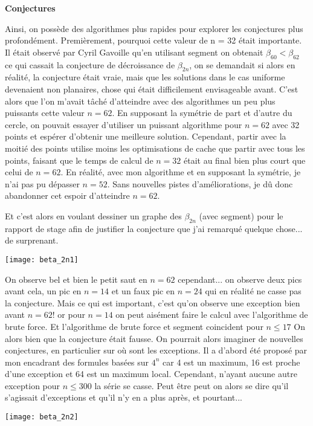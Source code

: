 \textbf{\Large{Conjectures}}

Ainsi, on possède des algorithmes plus rapides pour explorer les conjectures plus profondément. Premièrement, pourquoi cette valeur de n = 32 était importante. Il était observé par Cyril Gavoille qu'en utilisant segment on obtenait $\beta_{60} < \beta_{62}$ ce qui cassait la conjecture de décroissance de $\beta_{2n}$, on se demandait si alors en réalité, la conjecture était vraie, mais que les solutions dans le cas uniforme devenaient non planaires, chose qui était difficilement envisageable avant. C'est alors que l'on m'avait tâché d'atteindre avec des algorithmes un peu plus puissants cette valeur $n = 62$. En supposant la symétrie de part et d'autre du cercle, on pouvait essayer d'utiliser un puissant algorithme pour $n = 62$ avec 32 points et espérer d'obtenir une meilleure solution. Cependant, partir avec la moitié des points utilise moins les optimisations de cache que partir avec tous les points, faisant que le temps de calcul de $n = 32$ était au final bien plus court que celui de $n = 62$. En réalité, avec mon algorithme et en supposant la symétrie, je n'ai pas pu dépasser $n = 52$. Sans nouvelles pistes d'améliorations, je dû donc abandonner cet espoir d'atteindre $n = 62$.

Et c'est alors en voulant dessiner un graphe des $\beta_{2n}$ (avec segment) pour le rapport de stage afin de justifier la conjecture que j'ai remarqué quelque chose... de surprenant.

\texttt{[image: beta\_2n1]}

On observe bel et bien le petit saut en $n = 62$
cependant... on observe deux pics avant cela, un pic en $n = 14$ et un faux pic en $n = 24$ qui en réalité ne casse pas la conjecture. Mais ce qui est important, c'est qu'on observe une exception bien avant $n = 62$! or pour $n = 14$ on peut aisément faire le calcul avec l'algorithme de brute force. Et l'algorithme de brute force et segment coincident pour $n \leq 17$
On alors bien que la conjecture était fausse. On pourrait alors imaginer de nouvelles conjectures, en particulier sur où sont les exceptions. Il a d'abord été proposé par mon encadrant des formules basées sur $4^n$ car 4 est un maximum, 16 est proche d'une exception et 64 est un maximum local. Cependant, n'ayant aucune autre exception pour $n \leq 300$ la série se casse. Peut être peut on alors se dire qu'il s'agissait d'exceptions et qu'il n'y en a plus après, et pourtant...

\texttt{[image: beta\_2n2]}

